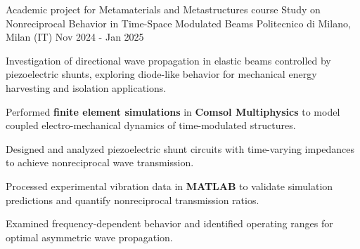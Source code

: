 
\cventry
{Academic project for Metamaterials and Metastructures course}
{Study on Nonreciprocal Behavior in Time-Space Modulated Beams}
{Politecnico di Milano, Milan (IT)}
{Nov 2024 - Jan 2025}
{
    Investigation of directional wave propagation in elastic beams controlled by piezoelectric shunts, exploring diode-like behavior for mechanical energy harvesting and isolation applications.
    \newline
    \vspace{4mm}
    \begin{cvitems}
        \item {Performed \textbf{finite element simulations} in \textbf{Comsol Multiphysics} to model coupled electro-mechanical dynamics of time-modulated structures.}
        \item {Designed and analyzed piezoelectric shunt circuits with time-varying impedances to achieve nonreciprocal wave transmission.}
        \item {Processed experimental vibration data in \textbf{MATLAB} to validate simulation predictions and quantify nonreciprocal transmission ratios.}
        \item {Examined frequency-dependent behavior and identified operating ranges for optimal asymmetric wave propagation.}
    \end{cvitems}
}
